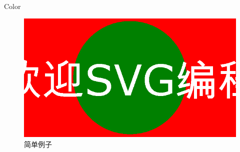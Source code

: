 \documentclass[main.tex]{subfiles}
\begin{document}
Color
\begin{figure}
	\centering
	\includegraphics[width=0.5\columnwidth]{images/svg/simple_example.eps}
	\caption{简单例子}
	\label{fig:I.1.}
\end{figure}

\newpage
\end{document}
